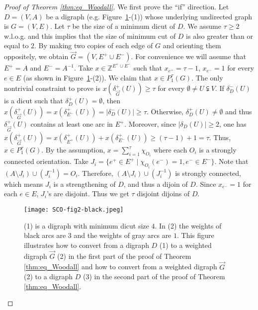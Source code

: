 \documentclass[runningheads]{llncs}
\newcommand{\Z}{\mathbb{Z}}
\begin{document}
\begin{proof}[Proof of Theorem \ref{thm:eq_Woodall}]
    We first prove the ``if'' direction. Let $D=(V,A)$ be a digraph (e.g. Figure~\ref{fig:sco_equivalence}-(1)) whose underlying undirected graph is $G=(V,E)$. Let $\tau$ be the size of a minimum dicut of $D$. We assume $\tau\geq 2$ w.l.o.g. and this implies that the size of minimum cut of $D$ is also greater than or equal to $2$. By making two copies of each edge of $G$ and orienting them oppositely, we obtain $\vec{G}=(V,E^+\cup E^-)$. For convenience we will assume that $E^+=A$ and $E^-=A^{-1}$. Take $x\in\Z^{E^+\cup E^-}$ such that $x_{e^+}=\tau-1$, $x_{e^-}=1$ for every $e\in E$ (as shown in Figure~\ref{fig:sco_equivalence}-(2)). We claim that $x\in P_1^\tau(G)$. The only nontrivial constraint to prove is $x(\delta_{\vec{G}}^+(U))\geq \tau$ for every $\emptyset \neq U\subsetneqq V$. If $\delta_D^-(U)$ is a dicut such that $\delta_D^+(U)=\emptyset$, then $x(\delta_{\vec{G}}^+(U))=x(\delta_{E^-}^+(U))=|\delta_D^-(U)|\geq \tau$. Otherwise, $\delta_D^+(U)\neq\emptyset$ and thus $\delta_{\vec{G}}^+(U)$ contains at least one arc in $E^+$. Moreover, since $|\delta_D(U)|\geq 2$, one has $x(\delta_{\vec{G}}^+(U))=x(\delta_{E^+}^+(U))+x(\delta_{E^-}^+(U))\geq (\tau-1)+1=\tau$. Thus, $x\in P_1^\tau(G)$. By the assumption, $x=\sum_{i=1}^{\tau}\chi_{O_i}$ where each $O_i$ is a strongly connected orientation.
Take $J_i=\{e^+\in E^+ \mid \chi_{O_i}(e^-)=1, e^-\in E^-\}$. Note that $(A\setminus J_i)\cup (J_i^{-1})=O_i$. Therefore, $(A\setminus J_i)\cup (J_i^{-1})$ is strongly connected, which means $J_i$ is a strengthening of $D$, and thus a dijoin of $D$. Since $x_{e^-}=1$ for each $e\in E$, $J_i$'s are disjoint. Thus we get $\tau$ disjoint dijoins of $D$.
\begin{figure}[htbp]
	\centering
	\texttt{[image: SCO-fig2-black.jpeg]}
 \caption{(1) is a digraph with minimum dicut size $4$. In (2) the weights of black arcs are $3$ and the weights of gray arcs are $1$. This figure illustrates how to convert from a digraph $D$ (1) to a weighted digraph $\vec{G}$ (2) in the first part of the proof of Theorem \ref{thm:eq_Woodall} and how to convert from a weighted digraph $\vec{G}$ (2) to a digraph $D$ (3) in the second part of the proof of Theorem \ref{thm:eq_Woodall}.}
 \label{fig:sco_equivalence}
\end{figure}


\end{proof}
\end{document}
